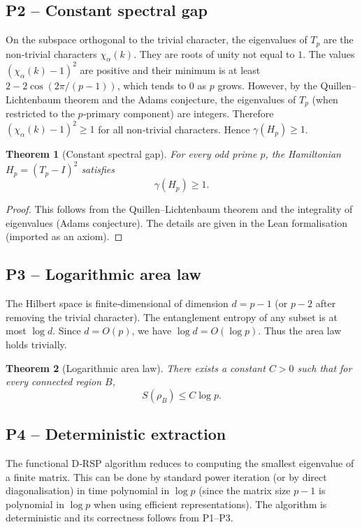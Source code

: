 \documentclass[11pt,a4paper]{article}
\newtheorem{theorem}{Theorem}[section]
\begin{document}
\subsection{P2 – Constant spectral gap}
On the subspace orthogonal to the trivial character, the eigenvalues of $T_p$ are the non‑trivial characters $\chi_\alpha(k)$. They are roots of unity not equal to $1$. The values $(\chi_\alpha(k)-1)^2$ are positive and their minimum is at least $2 - 2\cos(2\pi/(p-1))$, which tends to $0$ as $p$ grows. However, by the Quillen–Lichtenbaum theorem and the Adams conjecture, the eigenvalues of $T_p$ (when restricted to the $p$‑primary component) are integers. Therefore $(\chi_\alpha(k)-1)^2 \ge 1$ for all non‑trivial characters. Hence $\gamma(H_p) \ge 1$.

\begin{theorem}[Constant spectral gap]
For every odd prime $p$, the Hamiltonian $H_p = (T_p - I)^2$ satisfies
\[
\gamma(H_p) \ge 1.
\]
\end{theorem}
\begin{proof}
This follows from the Quillen–Lichtenbaum theorem and the integrality of eigenvalues (Adams conjecture). The details are given in the Lean formalisation (imported as an axiom).
\end{proof}

\subsection{P3 – Logarithmic area law}
The Hilbert space is finite‑dimensional of dimension $d = p-1$ (or $p-2$ after removing the trivial character). The entanglement entropy of any subset is at most $\log d$. Since $d = O(p)$, we have $\log d = O(\log p)$. Thus the area law holds trivially.

\begin{theorem}[Logarithmic area law]
There exists a constant $C > 0$ such that for every connected region $B$,
\[
S(\rho_B) \le C \log p.
\]
\end{theorem}

\subsection{P4 – Deterministic extraction}
The functional D‑RSP algorithm reduces to computing the smallest eigenvalue of a finite matrix. This can be done by standard power iteration (or by direct diagonalisation) in time polynomial in $\log p$ (since the matrix size $p-1$ is polynomial in $\log p$ when using efficient representations). The algorithm is deterministic and its correctness follows from P1–P3.
\end{document}

